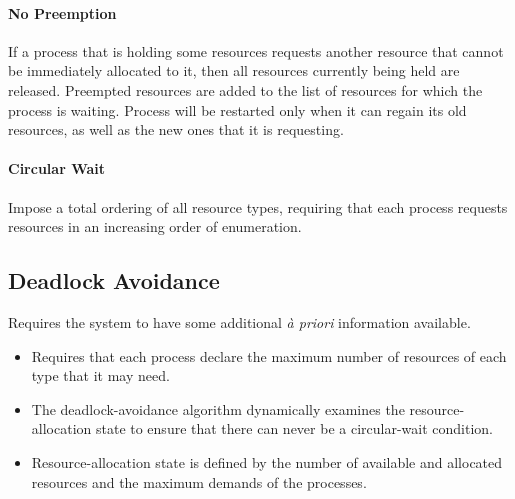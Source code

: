 \paragraph{No Preemption}
If a process that is holding some resources requests another resource that cannot be immediately allocated to it,
then all resources currently being held are released.
Preempted resources are added to the list of resources for which the process is waiting.
Process will be restarted only when it can regain its old resources, as well as the new ones that it is requesting.

\paragraph{Circular Wait}
Impose a total ordering of all resource types, requiring that each process requests resources in an increasing order of enumeration.

\subsection{Deadlock Avoidance}

Requires the system to have some additional \textit{à priori} information available.
\begin{itemize}
    \item Requires that each process declare the maximum number of resources of each type that it may need.
    \item The deadlock-avoidance algorithm dynamically examines the resource-allocation state to ensure that there can never be a circular-wait condition.
    \item Resource-allocation state is defined by the number of available and allocated resources and the maximum demands of the processes.
\end{itemize}